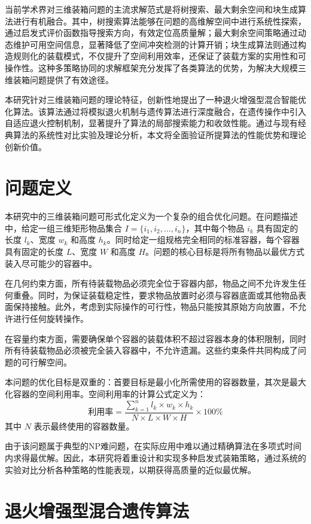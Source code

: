 \documentclass[UTF8]{ctexart}
\begin{document}
当前学术界对三维装箱问题的主流求解范式是将树搜索、最大剩余空间和块生成算法进行有机融合。其中，树搜索算法能够在问题的高维解空间中进行系统性探索，通过启发式评价函数指导搜索方向，有效定位高质量解；最大剩余空间策略通过动态维护可用空间信息，显著降低了空间冲突检测的计算开销；块生成算法则通过构造规则化的装载模式，不仅提升了空间利用效率，还保证了装载方案的实用性和可操作性。这种多策略协同的求解框架充分发挥了各类算法的优势，为解决大规模三维装箱问题提供了有效途径。

本研究针对三维装箱问题的理论特征，创新性地提出了一种退火增强型混合智能优化算法。该算法通过将模拟退火机制与遗传算法进行深度融合，在遗传操作中引入自适应退火控制机制，显著提升了算法的局部搜索能力和收敛性能。通过与现有经典算法的系统性对比实验及理论分析，本文将全面验证所提算法的性能优势和理论创新价值。

\section{问题定义}

本研究中的三维装箱问题可形式化定义为一个复杂的组合优化问题。在问题描述中，给定一组三维矩形物品集合 $I = \{i_1, i_2, ..., i_n\}$，其中每个物品 $i_k$ 具有固定的长度 $l_k$、宽度 $w_k$ 和高度 $h_k$。同时给定一组规格完全相同的标准容器，每个容器具有固定的长度 $L$、宽度 $W$ 和高度 $H$。问题的核心目标是将所有物品以最优方式装入尽可能少的容器中。

在几何约束方面，所有待装载物品必须完全位于容器内部，物品之间不允许发生任何重叠。同时，为保证装载稳定性，要求物品放置时必须与容器底面或其他物品表面保持接触。此外，考虑到实际操作的可行性，物品只能按其原始方向放置，不允许进行任何旋转操作。

在容量约束方面，需要确保单个容器的装载体积不超过容器本身的体积限制，同时所有待装载物品必须被完全装入容器中，不允许遗漏。这些约束条件共同构成了问题的可行解空间。

本问题的优化目标是双重的：首要目标是最小化所需使用的容器数量，其次是最大化容器的空间利用率。空间利用率的计算公式定义为：
$$ \text{利用率} = \frac{\sum_{k=1}^n l_k \times w_k \times h_k}{N \times L \times W \times H} \times 100\% $$
其中 $N$ 表示最终使用的容器数量。

由于该问题属于典型的NP难问题，在实际应用中难以通过精确算法在多项式时间内求得最优解。因此，本研究将着重设计和实现多种启发式装箱策略，通过系统的实验对比分析各种策略的性能表现，以期获得高质量的近似最优解。

\section{退火增强型混合遗传算法}
\end{document}
